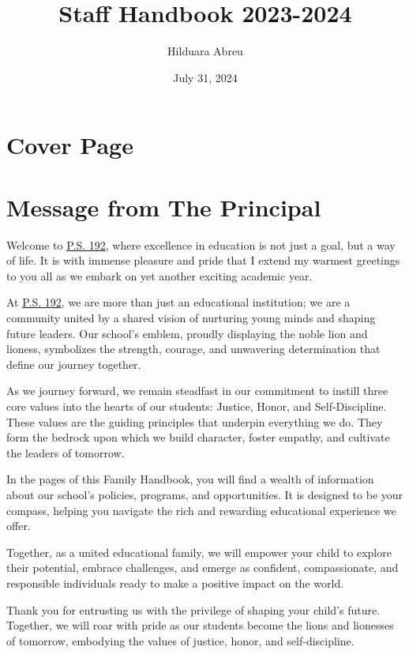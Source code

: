 \documentclass[11pt]{article}
\author{Hilduara Abreu}
\date{July 31, 2024}
\title{Staff Handbook 2023-2024}
\begin{document}
\maketitle
\tableofcontents


\section{Cover Page}
\label{sec:orga5c3105}


\section{Message from The Principal}
\label{sec:org4966fc0}

Welcome to \href{https://www.ps192.org}{P.S. 192}, where excellence in education is not just a goal, but a way of life. It is with immense pleasure and pride that I extend my warmest greetings to you all as we embark on yet another exciting academic year.

At \href{https://www.ps192.org}{P.S. 192}, we are more than just an educational institution; we are a community united by a shared vision of nurturing young minds and shaping future leaders. Our school's emblem, proudly displaying the noble lion and lioness, symbolizes the strength, courage, and unwavering determination that define our journey together.

As we journey forward, we remain steadfast in our commitment to instill three core values into the hearts of our students: Justice, Honor, and Self-Discipline. These values are the guiding principles that underpin everything we do. They form the bedrock upon which we build character, foster empathy, and cultivate the leaders of tomorrow.

In the pages of this Family Handbook, you will find a wealth of information about our school's policies, programs, and opportunities. It is designed to be your compass, helping you navigate the rich and rewarding educational experience we offer.

Together, as a united educational family, we will empower your child to explore their potential, embrace challenges, and emerge as confident, compassionate, and responsible individuals ready to make a positive impact on the world.

Thank you for entrusting us with the privilege of shaping your child's future. Together, we will roar with pride as our students become the lions and lionesses of tomorrow, embodying the values of justice, honor, and self-discipline.
\end{document}

